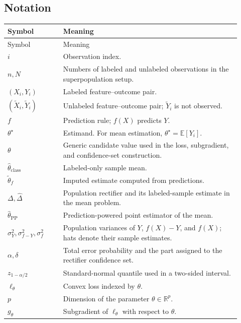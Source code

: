 \documentclass[11pt]{article}
\newcommand{\E}{\mathbb{E}}
\newcommand{\R}{\mathbb{R}}
\begin{document}
  \subsection*{Notation}
  
  \begin{longtable}{>{\raggedright\arraybackslash}p{0.22\linewidth}
                    >{\raggedright\arraybackslash}p{0.70\linewidth}}
  \toprule
  Symbol & Meaning \\
  \midrule
  \endfirsthead
  \toprule
  Symbol & Meaning \\
  \midrule
  \endhead
  \(i\) & Observation index. \\
  \(n,N\) & Numbers of labeled and unlabeled observations in the
  superpopulation setup. \\
  \((X_i,Y_i)\) & Labeled feature--outcome pair. \\
  \((\widetilde X_i,\widetilde Y_i)\) & Unlabeled feature--outcome pair;
  \(\widetilde Y_i\) is not observed. \\
  \(f\) & Prediction rule; \(f(X)\) predicts \(Y\). \\
  \(\theta^\star\) & Estimand. For mean estimation,
  \(\theta^\star=\E[Y_i]\). \\
  \(\theta\) & Generic candidate value used in the loss, subgradient, and
  confidence-set construction. \\
  \(\widehat\theta_{\mathrm{class}}\) & Labeled-only sample mean. \\
  \(\widetilde\theta_f\) & Imputed estimate computed from predictions. \\
  \(\Delta,\widehat\Delta\) & Population rectifier and its labeled-sample
  estimate in the mean problem. \\
  \(\widehat\theta_{\mathrm{PP}}\) & Prediction-powered point estimator of the
  mean. \\
  \(\sigma_Y^2,\sigma_{f-Y}^2,\sigma_f^2\) & Population variances of \(Y\),
  \(f(X)-Y\), and \(f(X)\); hats denote their sample estimates. \\
  \(\alpha,\delta\) & Total error probability and the part assigned to the
  rectifier confidence set. \\
  \(z_{1-\alpha/2}\) & Standard-normal quantile used in a two-sided interval. \\
  \(\ell_\theta\) & Convex loss indexed by \(\theta\). \\
  \(p\) & Dimension of the parameter \(\theta\in\R^p\). \\
  \(g_\theta\) & Subgradient of \(\ell_\theta\) with respect to \(\theta\). \\

\end{longtable}
\end{document}
